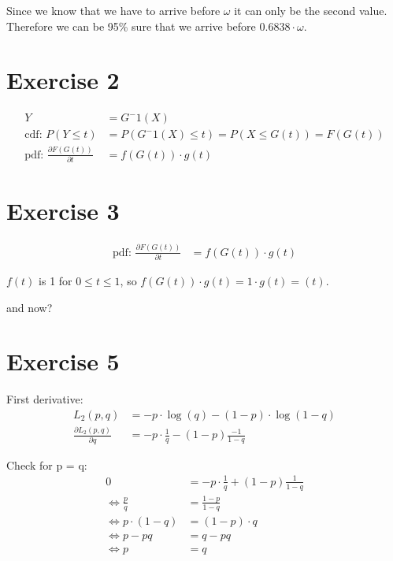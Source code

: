 Since we know that we have to arrive before $\omega$ it can only be the second value. Therefore we can be 95\% sure that we arrive before $0.6838 \cdot \omega$.


\section*{Exercise 2}
\begin{align*}
Y &= G^-1(X) \\
\mbox{cdf: } P\left(Y \leq t\right) &= P\left(G^-1\left(X\right) \leq t\right) = P\left(X \leq G\left(t\right)\right) = F\left(G\left(t\right)\right) \\
\mbox{pdf: } \frac{\partial F\left(G\left(t\right)\right)}{\partial t} &=f\left(G\left(t\right)\right) \cdot g\left(t\right)
\end{align*}

\section*{Exercise 3}
\begin{align*}
\mbox{pdf: } \frac{\partial F\left(G\left(t\right)\right)}{\partial t} &=f\left(G\left(t\right)\right) \cdot g\left(t\right)
\end{align*}

$f(t)$ is 1 for $0 \leq t \leq 1$, so $f\left(G\left(t\right)\right) \cdot g\left(t\right) = 1 \cdot g\left(t\right) = \left(t\right)$.

and now?

\section*{Exercise 5}
First derivative:
\begin{align*}
L_2\left(p,q\right) &= -p \cdot \log{\left(q\right)} - \left(1 - p\right) \cdot \log{\left(1-q\right)} \\
\frac{\partial L_2\left(p, q\right)}{\partial q} &= -p \cdot \frac{1}{q} - \left(1 - p\right) \frac{-1}{1-q}
\end{align*}

Check for p = q:
\begin{align*}
0 &= -p \cdot \frac{1}{q} + \left(1 - p\right) \frac{1}{1-q} \\
\Leftrightarrow \frac{p}{q} &= \frac{1-p}{1-q} \\
\Leftrightarrow p \cdot \left(1 - q\right) &= \left(1 - p\right) \cdot q \\
\Leftrightarrow p - pq &= q - pq \\
\Leftrightarrow p &= q
\end{align*}

